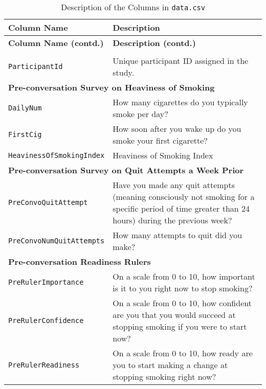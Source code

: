 \begin{longtable}{l p{10cm}}
\caption{Description of the Columns in \texttt{data.csv}}\\

\toprule
\textbf{Column Name} & \textbf{Description}\\
\midrule
\endfirsthead

\toprule
\textbf{Column Name (contd.)} & \textbf{Description (contd.)}\\
\midrule
\endhead


\endfoot

\bottomrule
\endlastfoot

\multicolumn{2}{l}{\textbf{Basic}} \\
\texttt{ParticipantId} & Unique participant ID assigned in the study.\\
\midrule


\multicolumn{2}{l}{\textbf{Pre-conversation Survey on Heaviness of Smoking}} \\
\texttt{DailyNum} & How many cigarettes do you typically smoke per day?\\ 
\texttt{FirstCig} & How soon after you wake up do you smoke your first cigarette?\\
\texttt{HeavinessOfSmokingIndex} & Heaviness of Smoking Index \citep{heatherton1989measuring}\\
\midrule

\multicolumn{2}{l}{\textbf{Pre-conversation Survey on Quit Attempts a Week Prior}} \\
\texttt{PreConvoQuitAttempt} & Have you made any quit attempts (meaning consciously not smoking for a specific period of time greater than 24 hours) during the previous week?\\
\texttt{PreConvoNumQuitAttempts} & How many attempts to quit did you make?\\
\midrule


\multicolumn{2}{l}{\textbf{Pre-conversation Readiness Rulers}} \\
\texttt{PreRulerImportance} & On a scale from 0 to 10, how important is it to you right now to stop smoking?\\
\texttt{PreRulerConfidence} & On a scale from 0 to 10, how confident are you that you would succeed at stopping smoking if you were to start now?\\
\texttt{PreRulerReadiness} & On a scale from 0 to 10, how ready are you to start making a change at stopping smoking right now?\\
\midrule


\end{longtable}
